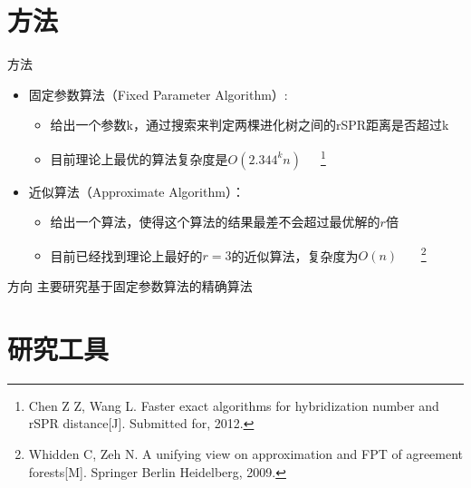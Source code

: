 \documentclass[slidestop,compress,mathserif,red]{beamer}
\begin{document}
\section{方法}
\begin{frame}{方法}
  \begin{itemize} 
    \item 固定参数算法（Fixed Parameter Algorithm）:
    \begin{itemize}
      \item 给出一个参数k，通过搜索来判定两棵进化树之间的rSPR距离是否超过k
      \item 目前理论上最优的算法复杂度是$O(2.344^{k}n)$~~~\footnote{\tiny{Chen Z Z, Wang L. Faster exact algorithms for hybridization number and rSPR distance[J]. Submitted for, 2012.}}
      \newline{}
    \end{itemize}

    \pause

    \item 近似算法（Approximate Algorithm）：
    \begin{itemize}
      \item 给出一个算法，使得这个算法的结果最差不会超过最优解的$r$倍
      \item 目前已经找到理论上最好的$r=3$的近似算法，复杂度为$O(n)$~~~ \footnote{\tiny{Whidden C, Zeh N. A unifying view on approximation and FPT of agreement forests[M]. Springer Berlin Heidelberg, 2009.}}
    \end{itemize}

    \pause

  \end{itemize}

  \begin{alertblock}{方向}
     主要研究基于固定参数算法的精确算法
     \newline{}
  \end{alertblock}
\end{frame}

\section{研究工具}
\end{document}
